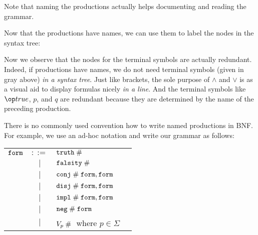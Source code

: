 Note that naming the productions actually helps documenting and reading the grammar.

Now that the productions have names, we can use them to label the nodes in the syntax tree:

\begin{center}
\end{center}

Now we observe that the nodes for the terminal symbols are actually redundant. Indeed, if productions have names, we do not need terminal symbols (given in gray above) \emph{in a syntax tree}. Just like brackets, the sole purpose of $\wedge$ and $\vee$ is as a visual aid to display formulas nicely \emph{in a line}. And the terminal symbols like $\true$, $p$, and $q$ are redundant because they are determined by the name of the preceding production.

There is no commonly used convention how to write named productions in BNF. For example, we use an ad-hoc notation and write our grammar as follows:

\begin{center}
\begin{tabular}{lcl@{\tb}l}
$\mathtt{form}$ & $::=$ & $\mathtt{truth} \;\#\; $ & \\
     &  $|$  & $\mathtt{falsity} \;\#\; $ &  \\
     &  $|$  & $\mathtt{conj} \;\#\; \mathtt{form}, \mathtt{form}$ &  \\
     &  $|$  & $\mathtt{disj} \;\#\; \mathtt{form}, \mathtt{form}$ &  \\
     &  $|$  & $\mathtt{impl} \;\#\; \mathtt{form}, \mathtt{form}$ &  \\
     &  $|$  & $\mathtt{neg} \;\#\; \mathtt{form}$ & \\
     &  $|$  & $V_p \;\#\; $ where $p\in\Sigma$ \\
\end{tabular}
\end{center}

